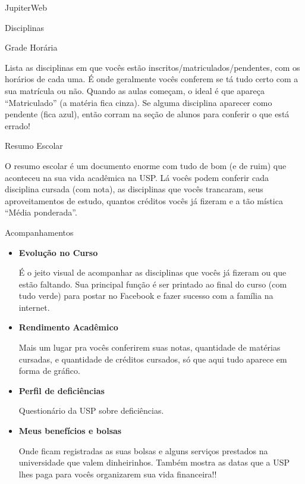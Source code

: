 \begin{secao}{JupiterWeb}
\begin{subsecao}{Disciplinas}
\end{subsecao}

\begin{subsecao}{Grade Horária}

Lista as disciplinas em que vocês estão inscritos/matriculados/pendentes, com os
horários de cada uma. É onde geralmente vocês conferem se tá tudo certo com a
sua matrícula ou não. Quando as aulas começam, o ideal é que apareça
“Matriculado” (a matéria fica cinza). Se alguma disciplina aparecer como
pendente (fica azul), então corram na seção de alunos para conferir o que está
errado!

\end{subsecao}

\begin{subsecao}{Resumo Escolar}

O resumo escolar é um documento enorme com tudo de bom (e de ruim) que
aconteceu na sua vida acadêmica na USP. Lá vocês podem conferir cada
disciplina cursada (com nota), as disciplinas que vocês trancaram, seus
aproveitamentos de estudo, quantos créditos vocês já fizeram e a tão mística
“Média ponderada”.

\end{subsecao}

\begin{subsecao}{Acompanhamentos}

\begin{itemize}
  \item \textbf{Evolução no Curso}

    É o jeito visual de acompanhar as disciplinas que vocês já fizeram ou que
    estão faltando. Sua principal função é ser printado ao final do curso (com
    tudo verde) para postar no Facebook e fazer sucesso com a família na
    internet.
  \item \textbf{Rendimento Acadêmico}

    Mais um lugar pra vocês conferirem suas notas, quantidade de matérias
    cursadas, e quantidade de créditos cursados, só que aqui tudo aparece em
    forma de gráfico.
  \item \textbf{Perfil de deficiências}

    Questionário da USP sobre deficiências.

  \item \textbf{Meus benefícios e bolsas}

    Onde ficam registradas as suas bolsas e alguns serviços prestados na
    universidade que valem dinheirinhos. Também mostra as datas que a USP lhes
    paga para vocês organizarem sua vida financeira!!


\end{itemize}
\end{subsecao}
\end{secao}
